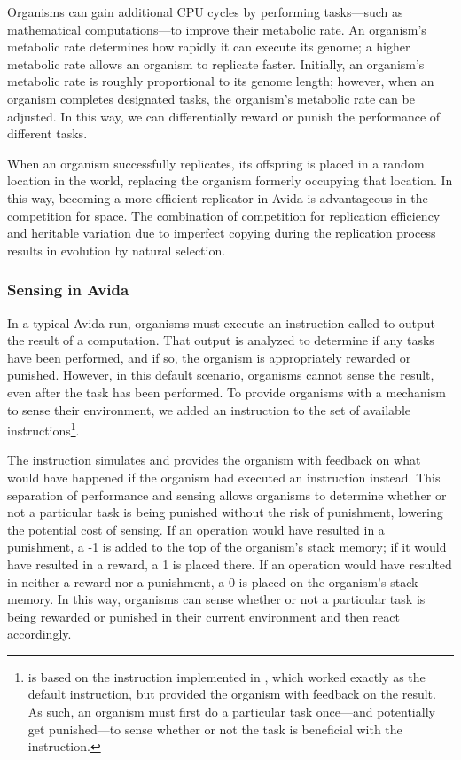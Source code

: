 Organisms can gain additional CPU cycles by performing tasks---such as mathematical computations---to improve their metabolic rate. 
An organism's metabolic rate determines how rapidly it can execute its genome; a higher metabolic rate allows an organism to replicate faster. 
Initially, an organism's metabolic rate is roughly proportional to its genome length; however, when an organism completes designated tasks, the organism's metabolic rate can be adjusted.
In this way, we can differentially reward or punish the performance of different tasks.

When an organism successfully replicates, its offspring is placed in a random location in the world, replacing the organism formerly occupying that location. 
In this way, becoming a more efficient replicator in Avida is advantageous in the competition for space. 
The combination of competition for replication efficiency and heritable variation due to imperfect copying during the replication process results in evolution by natural selection. 

\subsubsection{Sensing in Avida}
\label{chapter:origins-of-plasticity:sec:methods:avida:sensing}

In a typical Avida run, organisms must execute an instruction called  to output the result of a computation. 
That output is analyzed to determine if any tasks have been performed, and if so, the organism is appropriately rewarded or punished. 
However, in this default scenario, organisms cannot sense the result, even after the task has been performed. 
To provide organisms with a mechanism to sense their environment, we added an  instruction to the set of available instructions\footnote{
 is based on the  instruction implemented in \citep{clune_investigating_2007}, which worked exactly as the default  instruction, but provided the organism with feedback on the result.
As such, an organism must first do a particular task once---and potentially get punished---to sense whether or not the task is beneficial with the  instruction.
}.

The  instruction simulates  and provides the organism with feedback on what would have happened if the organism had executed an  instruction instead. 
This separation of  performance and sensing allows organisms to determine whether or not a particular task is being punished without the risk of punishment, lowering the potential cost of sensing. 
If an  operation would have resulted in a punishment, a -1 is added to the top of the organism's stack memory; if it would have resulted in a reward, a 1 is placed there. 
If an  operation would have resulted in neither a reward nor a punishment, a 0 is placed on the organism's stack memory. 
In this way, organisms can sense whether or not a particular task is being rewarded or punished in their current environment and then react accordingly.  

